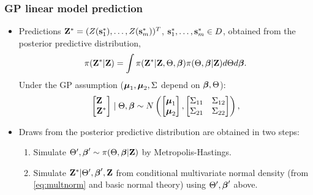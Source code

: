 \documentclass{beamer}
\begin{document}
\begin{frame}
\frametitle{GP linear model prediction}
\begin{itemize}
\item Predictions ${\bf Z} ^* = (Z({\bf s}_1^*),\dots,Z({\bf
    s}_m^*))^T$, ${\bf s}_1^*,\dots,{\bf s}_m^* \in D$, obtained from
  the posterior predictive distribution,
\begin{equation*}
\pi({\bf Z} ^*|{\bf Z} ) = \int
\pi({\bf Z} ^*|{\bf Z} ,\Theta,\mbox{\boldmath $\beta$}) \pi(\Theta,\mbox{\boldmath $\beta$}|{\bf Z} )
d\Theta d\mbox{\boldmath $\beta$}. 
\end{equation*}
Under the GP assumption ($\mbox{\boldmath $\mu$}_1,\mbox{\boldmath $\mu$}_2,\Sigma$ depend on $\mbox{\boldmath $\beta$},\Theta$):
\begin{equation}\label{eq:multnorm}
\begin{bmatrix} {\bf Z} \phantom{a} \\ {\bf Z} ^* \end{bmatrix} \mid \Theta, \mbox{\boldmath $\beta$} \sim N
\left(
  \begin{bmatrix} {\mbox{\boldmath $\mu$}}_1\\ {\mbox{\boldmath $\mu$}}_2 \end{bmatrix},
\begin{bmatrix} \Sigma_{11} & \Sigma_{12} \\ \Sigma_{21} & \Sigma_{22} \end{bmatrix}\right),
\end{equation}
\item Draws from the posterior predictive distribution are obtained in
  two steps: 
\begin{enumerate}
\item Simulate $\Theta',\mbox{\boldmath $\beta$}' \sim
  \pi(\Theta,\mbox{\boldmath $\beta$}|{\bf Z} )$ by 
  Metropolis-Hastings.
\item Simulate ${\bf Z} ^* |  \Theta',\mbox{\boldmath $\beta$}',{\bf
    Z} $ from  conditional multivariate normal density (from
\eqref{eq:multnorm} and basic
  normal theory) using $\Theta',\mbox{\boldmath $\beta$}'$ above.
\end{enumerate}

\end{itemize}
\end{frame}
\end{document}
